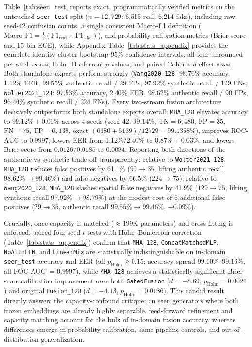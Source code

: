 \documentclass[fleqn,10pt]{wlscirep}
\begin{document}
Table~\ref{tab:seen_test} reports exact, programmatically verified metrics on the untouched \texttt{seen\_test} split ($n=12,729$: 6,515 real, 6,214 fake), including raw seed-42 confusion counts, a single consistent Macro-F1 definition ($\text{Macro-F1} = \frac{1}{2}(\text{F1}_{\text{real}}+\text{F1}_{\text{fake}})$), and probability calibration metrics (Brier score and 15-bin ECE), while Appendix Table~\ref{tab:stats_appendix} provides the complete identity-cluster bootstrap 95\% confidence intervals, all four unrounded per-seed scores, Holm--Bonferroni $p$-values, and paired Cohen's $d$ effect sizes. Both standalone experts perform strongly (\texttt{Wang2020\_128}: 98.76\% accuracy, 1.12\% EER, 99.55\% authentic recall / 29 FPs, 97.92\% synthetic recall / 129 FNs; \texttt{Wolter2021\_128}: 97.53\% accuracy, 2.40\% EER, 98.62\% authentic recall / 90 FPs, 96.40\% synthetic recall / 224 FNs). Every two-stream fusion architecture decisively outperforms both standalone experts overall: \texttt{MHA\_128} elevates accuracy to $99.12\% \pm 0.01\%$ across 4 seeds (seed 42: $99.14\%$, $\text{TN}=6,480$, $\text{FP}=35$, $\text{FN}=75$, $\text{TP}=6,139$, exact $(6480+6139)/12729=99.1358\%$), improves ROC-AUC to $0.9997$, lowers EER from 1.12\%/2.40\% to $0.87\% \pm 0.03\%$, and lowers Brier score from $0.0126$/$0.0185$ to $0.0084$. Reporting both directions of the authentic-vs-synthetic trade-off transparently: relative to \texttt{Wolter2021\_128}, \texttt{MHA\_128} reduces false positives by 61.1\% ($90 \to 35$, lifting authentic recall $98.62\% \to 99.46\%$) and false negatives by 66.5\% ($224 \to 75$); relative to \texttt{Wang2020\_128}, \texttt{MHA\_128} slashes spatial false negatives by 41.9\% ($129 \to 75$, lifting synthetic recall $97.92\% \to 98.79\%$) at the modest cost of 6 additional false positives ($29 \to 35$, authentic recall $99.55\% \to 99.46\%$, $-0.09\%$).

Crucially, once capacity is matched ($\approx$199K parameters) and cross-fitting is enforced, paired four-seed $t$-tests with Holm--Bonferroni correction (Table~\ref{tab:stats_appendix}) confirm that \texttt{MHA\_128}, \texttt{ConcatMatchedMLP}, \texttt{NoAttnFFN}, and \texttt{LinearMix} are statistically indistinguishable on in-domain \texttt{seen\_test} accuracy and EER (all $p_{\text{Holm}} \ge 0.15$; accuracy spread $99.10\%$--$99.16\%$, all ROC-AUC $=0.9997$), while \texttt{MHA\_128} achieves a statistically significant Brier-score calibration improvement over both \texttt{GatedFusion} ($d=-8.69$, $p_{\text{Holm}}=0.0021$) and original \texttt{Fusion\_128} ($d=-4.13$, $p_{\text{Holm}}=0.0186$). This candid result directly answers the capacity-confound critique: on seen generators where both frozen embeddings are already highly separable, feed-forward refinement and capacity matching account for the bulk of in-domain fusion accuracy, whereas differences emerge in probability calibration, same-pipeline controls, and out-of-distribution generalization.
\end{document}
